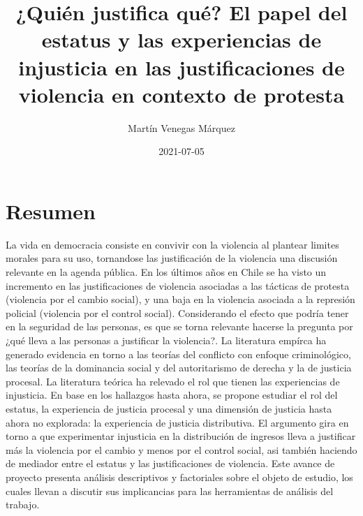 \documentclass[12pt,twoside]{templates/facsothesis}
\title{¿Quién justifica qué? El papel del estatus y las experiencias de injusticia en las justificaciones de violencia en contexto de protesta}
\author{Martín Venegas Márquez}
\date{2021-07-05}
\begin{document}

  \maketitle

\frontmatter %
\pagestyle{empty} %



  \setcounter{tocdepth}{1}
  \setlength{\parskip}{0pt}
  \tableofcontents

\setlength\parskip{1em plus 0.1em minus 0.2em}

  \listoftables

  \listoffigures



\mainmatter %
\pagestyle{fancyplain} %

\hypertarget{resumen}{%
\chapter*{Resumen}\label{resumen}}

La vida en democracia consiste en convivir con la violencia al plantear limites morales para su uso, tornandose las justificación de la violencia una discusión relevante en la agenda pública. En los últimos años en Chile se ha visto un incremento en las justificaciones de violencia asociadas a las tácticas de protesta (violencia por el cambio social), y una baja en la violencia asociada a la represión policial (violencia por el control social). Considerando el efecto que podría tener en la seguridad de las personas, es que se torna relevante hacerse la pregunta por ¿qué lleva a las personas a justificar la violencia?. La literatura empírca ha generado evidencia en torno a las teorías del conflicto con enfoque criminológico, las teorías de la dominancia social y del autoritarismo de derecha y la de justicia procesal. La literatura teórica ha relevado el rol que tienen las experiencias de injusticia. En base en los hallazgos hasta ahora, se propone estudiar el rol del estatus, la experiencia de justicia procesal y una dimensión de justicia hasta ahora no explorada: la experiencia de justicia distributiva. El argumento gira en torno a que experimentar injusticia en la distribución de ingresos lleva a justificar más la violencia por el cambio y menos por el control social, asi también haciendo de mediador entre el estatus y las justificaciones de violencia. Este avance de proyecto presenta análisis descriptivos y factoriales sobre el objeto de estudio, los cuales llevan a discutir sus implicancias para las herramientas de análisis del trabajo.
\end{document}
